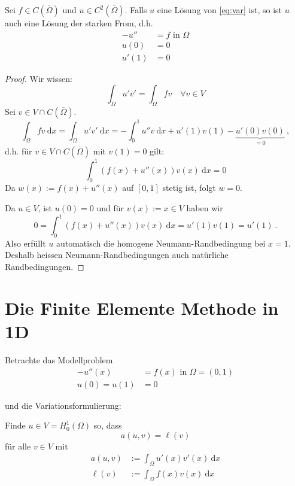 \begin{satz}[(V) $\implies$ (P)]
    Sei $f \in C(\overline \Omega)$ und $u \in C^2(\overline \Omega)$. Falls $u$ eine Lösung von \eqref{eq:var} ist, so ist $u$ auch eine 
    Lösung der starken From, d.h.
    \begin{align*}
        -u'' &= f \text{ in } \Omega \\
        u(0) &= 0 \\
        u'(1) &= 0
    \end{align*}
\end{satz}
\begin{proof}
    Wir wissen:
    \[
        \int_\Omega u' v' = \int_\Omega f v \quad \forall v \in V
    \]
    Sei $v \in V \cap C(\overline \Omega)$.
    \[
        \int_\Omega f v \ \mathrm dx
            = \int_\Omega u' v' \ \mathrm dx
            = - \int_0^1 u'' v \ \mathrm dx +  u'(1) v(1) - \underbrace{u'(0) v(0)}_{=0} \ ,
    \]
    d.h. für $v \in V \cap C(\overline \Omega)$ mit $v(1) = 0$ gilt:
    \[
        \int_0^1 \left( f(x) + u''(x) \right) v(x) \ \mathrm dx = 0
    \]
    Da $w(x) := f(x) + u''(x)$ auf $[0,1]$ stetig ist, folgt $w = 0$.

    Da $u \in V$, ist $u(0) = 0$ und für $v(x) := x \in V$ haben wir
    \[
        0 = \int_0^1 \left( f(x) + u''(x) \right) v(x) \ \mathrm dx = u'(1) v(1) = u'(1) \ .
    \]
    Also erfüllt $u$ automatisch die homogene Neumann-Randbedingung bei $x=1$. Deshalb heissen 
    Neumann-Randbedingungen auch natürliche Randbedingungen.
\end{proof}

\section{Die Finite Elemente Methode in 1D}

Betrachte das Modellproblem
\begin{align*}
    -u''(x) &= f(x) \text{ in } \Omega = (0,1) \\
    u(0) = u(1) &= 0
    \label{eq:p}
    \tag{P}
\end{align*}

und die Variationsformulierung:

Finde $u \in V = H_0^1(\Omega)$ so, dass 
\[
    a(u,v) = \ell(v) \label{eq:var} \tag{V}
\]
für alle $v \in V$ mit
\begin{align*}
    a(u,v) &:= \int_\Omega u'(x) v'(x) \ \mathrm dx \\
    \ell(v) &:= \int_\Omega f(x) v(x) \ \mathrm dx
\end{align*}


